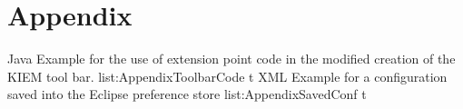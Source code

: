 \chapter{Appendix}
\listingjava
{}
{Java}
{Example for the use of extension point code in the modified creation of the \ac{KIEM} tool bar.}
{list:AppendixToolbarCode}
{t}
\listingxml
{}
{XML}
{Example for a configuration saved into the Eclipse preference store}
{list:AppendixSavedConf}
{t}